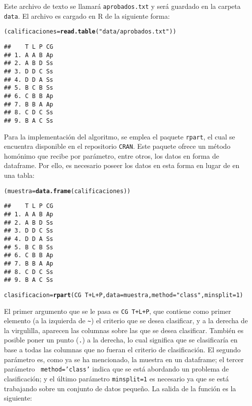 \documentclass[12pt]{report}\usepackage[]{graphicx}\usepackage[dvipsnames]{xcolor}
\makeatletter
\newcommand{\hlnum}[1]{\textcolor[rgb]{0.686,0.059,0.569}{#1}}%
\newcommand{\hlstr}[1]{\textcolor[rgb]{0.192,0.494,0.8}{#1}}%
\newcommand{\hlopt}[1]{\textcolor[rgb]{0,0,0}{#1}}%
\newcommand{\hlstd}[1]{\textcolor[rgb]{0.345,0.345,0.345}{#1}}%
\newcommand{\hlkwb}[1]{\textcolor[rgb]{0.69,0.353,0.396}{#1}}%
\newcommand{\hlkwc}[1]{\textcolor[rgb]{0.333,0.667,0.333}{#1}}%
\newcommand{\hlkwd}[1]{\textcolor[rgb]{0.737,0.353,0.396}{\textbf{#1}}}%
\newenvironment{kframe}{%
 \def\at@end@of@kframe{}%
 \ifinner\ifhmode%
  \def\at@end@of@kframe{\end{minipage}}%
  \begin{minipage}{\columnwidth}%
 \fi\fi%
 \def\FrameCommand##1{\hskip\@totalleftmargin \hskip-\fboxsep
 \colorbox{shadecolor}{##1}\hskip-\fboxsep
     \hskip-\linewidth \hskip-\@totalleftmargin \hskip\columnwidth}%
 \MakeFramed {\advance\hsize-\width
   \@totalleftmargin\z@ \linewidth\hsize
   \@setminipage}}%
 {\par\unskip\endMakeFramed%
 \at@end@of@kframe}
\newenvironment{knitrout}{}{} %
\makeatother
\begin{document}
				Este archivo de texto se llamará \texttt{aprobados.txt} y será guardado en la carpeta \texttt{data}. El archivo es cargado en R de la siguiente forma:
				
\begin{knitrout}
\color{fgcolor}\begin{kframe}
\begin{alltt}
\hlstd{(calificaciones}\hlkwb{=}\hlkwd{read.table}\hlstd{(}\hlstr{"data/aprobados.txt"}\hlstd{))}
\end{alltt}
\begin{verbatim}
##    T L P CG
## 1. A A B Ap
## 2. A B D Ss
## 3. D D C Ss
## 4. D D A Ss
## 5. B C B Ss
## 6. C B B Ap
## 7. B B A Ap
## 8. C D C Ss
## 9. B A C Ss
\end{verbatim}
\end{kframe}
\end{knitrout}
				
				Para la implementación del algoritmo, se emplea el paquete \texttt{rpart}, el cual se encuentra disponible en el repositorio \texttt{CRAN}. Este paquete ofrece un método homónimo que recibe por parámetro, entre otros, los datos en forma de dataframe. Por ello, es necesario poseer los datos en esta forma en lugar de en una tabla:
				
\begin{knitrout}
\color{fgcolor}\begin{kframe}
\begin{alltt}
\hlstd{(muestra}\hlkwb{=}\hlkwd{data.frame}\hlstd{(calificaciones))}
\end{alltt}
\begin{verbatim}
##    T L P CG
## 1. A A B Ap
## 2. A B D Ss
## 3. D D C Ss
## 4. D D A Ss
## 5. B C B Ss
## 6. C B B Ap
## 7. B B A Ap
## 8. C D C Ss
## 9. B A C Ss
\end{verbatim}
\begin{alltt}
\hlstd{clasificacion} \hlkwb{=} \hlkwd{rpart}\hlstd{(CG}\hlopt{~}\hlstd{T}\hlopt{+}\hlstd{L}\hlopt{+}\hlstd{P,} \hlkwc{data}\hlstd{=muestra,} \hlkwc{method}\hlstd{=}\hlstr{"class"}\hlstd{,} \hlkwc{minsplit}\hlstd{=}\hlnum{1}\hlstd{)}
\end{alltt}
\end{kframe}
\end{knitrout}
				
				El primer argumento que se le pasa es \texttt{CG~T+L+P}, que contiene como primer elemento (a la izquierda de \texttt{\~}) el criterio que se desea clasificar, y a la derecha de la virgulilla, aparecen las columnas sobre las que se desea clasificar. También es posible poner un punto (\texttt{.}) a la derecha, lo cual significa que se clasificaría en base a todas las columnas que no fueran el criterio de clasificación. El segundo parámetro es, como ya se ha mencionado, la muestra en un dataframe; el tercer parámetro \texttt{ method='class'} indica que se está abordando un problema de clasificación; y el último parámetro \texttt{minsplit=1} es necesario ya que se está trabajando sobre un conjunto de datos pequeño. La salida de la función es la siguiente:
				
\end{document}
